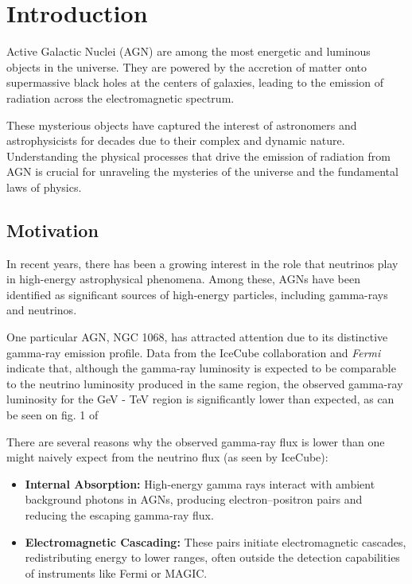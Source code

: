 \chapter{Introduction}
\label{chap:Introduction}

Active Galactic Nuclei (AGN) are among the most energetic and luminous objects in the universe. They are powered by the accretion of matter onto supermassive black holes at the centers of galaxies, leading to the emission of radiation across the electromagnetic spectrum. 

These mysterious objects have captured the interest of astronomers and astrophysicists for decades due to their complex and dynamic nature. Understanding the physical processes that drive the emission of radiation from AGN is crucial for unraveling the mysteries of the universe and the fundamental laws of physics.

\section{Motivation}

In recent years, there has been a growing interest in the role that neutrinos play in high-energy astrophysical phenomena. Among these, AGNs have been identified as significant sources of high-energy particles, including gamma-rays and neutrinos. 

One particular AGN, NGC 1068, has attracted attention due to its distinctive gamma-ray emission profile. Data from the IceCube collaboration \citep{IceCube2022} and \textit{Fermi} indicate that, although the gamma-ray luminosity is expected to be comparable to the neutrino luminosity produced in the same region, the observed gamma-ray luminosity for the GeV - TeV region is significantly lower than expected, as can be seen on fig. 1 of \citet{padovani2024highenergyneutrinosvicinitysupermassive}

There are several reasons why the observed gamma-ray flux is lower than one might naively expect from the neutrino flux (as seen by IceCube):

\newpage

\begin{itemize}
    \item \textbf{Internal Absorption:} High-energy gamma rays interact with ambient background photons in AGNs, producing electron–positron pairs and reducing the escaping gamma-ray flux.
    \item \textbf{Electromagnetic Cascading:} These pairs initiate electromagnetic cascades, redistributing energy to lower ranges, often outside the detection capabilities of instruments like Fermi or MAGIC.
\end{itemize}

